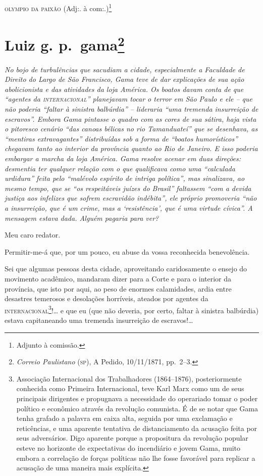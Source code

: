 {\begin{flushright}
\textsc{olympio da paixão} (Adj:. à com:.)\footnote{ Adjunto à comissão.}
\end{flushright}

\chapter{Luiz g. p.~gama\footnote{\emph{Correio Paulistano} (\textsc{sp}), A Pedido, 10/11/1871,
  pp.~2--3.}} %

\begin{didascalia}
\emph{No bojo de turbulências que sacudiam a cidade, especialmente a
Faculdade de Direito do Largo de São Francisco, Gama teve de dar
explicações de sua ação abolicionista e das atividades da loja América.
Os boatos davam conta de que ``agentes da \textsc{internacional}'' planejavam tocar
o terror em São Paulo e ele -- que não poderia ``faltar à sinistra
balbúrdia'' -- lideraria ``uma tremenda insurreição de escravos''. Embora
Gama pintasse o quadro com as cores de sua sátira, haja vista o
pitoresco cenário ``das canoas bélicas no rio Tamanduateí'' que se
desenhava, as ``mentiras extravagantes'' distribuídas sob a forma de
``boatos humorísticos'' chegavam tanto ao interior da província quanto ao
Rio de Janeiro. E isso poderia embargar a marcha da loja América. Gama
resolve acenar em duas direções: desmentia ter qualquer relação com o
que qualificava como uma ``calculada urdidura'' feita pelo ``malévolo
espírito de intriga política'', mas sinalizava, ao mesmo tempo, que se
``os respeitáveis juízes do Brasil'' faltassem ``com a devida justiça aos
infelizes que sofrem escravidão indébita'', ele próprio promoveria ``não a
insurreição, que é um crime, mas a `resistência', que é uma virtude
cívica''. A mensagem estava dada. Alguém pagaria para ver?}
\end{didascalia}


Meu caro redator.

Permitir-me-á que, por um pouco, eu abuse da vossa reconhecida
benevolência.

Sei que algumas pessoas desta cidade, aproveitando caridosamente o
ensejo do movimento acadêmico, mandaram dizer para a Corte e para o
interior da província, que isto por aqui, ao peso de enormes
calamidades, ardia entre desastres temerosos e desolações horríveis,
ateados por agentes da \textsc{internacional}\footnote{ Associação Internacional
  dos Trabalhadores (1864--1876), posteriormente conhecida como Primeira
  Internacional, teve Karl Marx como um de seus principais dirigentes e
  propugnava a necessidade do operariado tomar o poder político e
  econômico através da revolução comunista. É de se notar que Gama tenha
  grafado a palavra em caixa alta, seguida por uma exclamação e
  reticências, e uma aparente tentativa de distanciamento da acusação
  feita por seus adversários. Digo aparente porque a propositura da
  revolução popular esteve no horizonte de expectativas do incendiário e
  jovem Gama, muito embora a correlação de forças políticas não lhe
  fosse favorável para replicar a acusação de uma maneira mais
  explícita.}!\ldots{} e que eu (que não deveria, por certo, faltar à
sinistra balbúrdia) estava capitaneando uma tremenda insurreição de
escravos!\ldots{}

}

